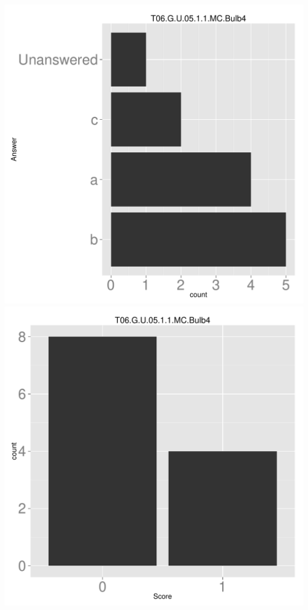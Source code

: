 \documentclass[12pt,english,nohyper]{tufte-handout}\usepackage[]{graphicx}\usepackage[]{color}
\begin{document}
\begin{center} \includegraphics[width=.45\linewidth]{Topic06_AB_86_answer} \includegraphics[width=.45\linewidth]{Topic06_AB_86_score} \end{center} 
\end{document}
